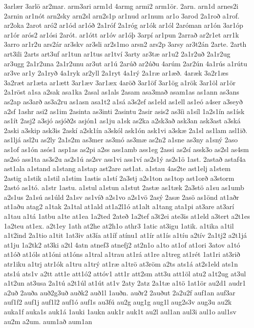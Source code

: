 {3arlær
3arlö
ar2mar.
arm3ari
arm1d
4armg
armi2
arm1ör.
2arn.
arn1d
arnes2i
2arnin
ar1nót
arn2sky
arn2sl
arn2s1p
ar1nud
ar1num
ar1o
3arod
2a1roð
a1rof.
ar2oka
2arot
aró2
ar1ód
ar1óð
2a1róf
2a1róg
ar1ók
ar1ól
2aróman
ar1ón
3ar1óp
ar1ór
arós2
ar1ósi
2arót.
ar1ótt
ar1óv
ar1óþ
3arpí
ar1pun
2arrað
ar2r1et
arr1k
3arro
ar1r2u
ars2ár
ar3skv
ar3sli
ar2s1mo
arsn2
ars2p
3arsy
ar3t2án
2arte.
2arth
art3ili
2arts
art3uf
ar1tun
ar1tus
ar1tví
3arty
ar3tæ
ar1u2
2a1r2uð
2a1r2ug
ar3ugg
2a1r2una
2a1r2unu
ar3ut
ar1ú
2arúð
ar2úðu
4arúm
2ar2ún
4a1rús
a1rútu
ar3ve
ar1y
2a1ryð
4a1ryk
ar2yll
2a1ryt
4a1rý
2a1ræ
ar1æð.
4aræk
3a2r1æs
3a2ræt
ar1æta
ar1ætt
3ar1æv
3ar1æx
4aröð
3ar1öf
3ar1ög
a1rök
3ar1öl
ar1ör
2a1röst
a1sa
a2sak
asa1ka
2asal
as1als
2asam
asa3mað
asam1as
as1ann
as3ans
as2ap
as3arð
as3a2ru
as1asn
asa1t2
a1sá
a3s2ef
as1eld
as1ell
as1eó
a4ser
a3seyð
a2sf
1ashr
asi2
as1im
2asinta
as3inti
2asintu
2asir
asis2
as3íi
a1síl
1a2s1ín
as1ísk
as1ít
2asj2
a3sjó
asjóð2s
asjón1
as1ju
a1sk
as2ka
a2sk3að
ask3an
ask3ast
a3ská
2aski
a3skip
ask3is
2askí
a2sk1ín
a3skól
ask1ón
ask1vi
a3skæ
2a1sl
as1lam
asl1ið.
as1ljá
asl2u
as2ly
2a1s2m
as3mer
as3mó
as3mæ
as2n2
a1sne
as3ny
a1sný
2aso
as1of
as1ón
asós1
asp1as
as2pi
a2ss
ass1amb
ass1eg
2assi
as2sí
assk3o
as2sl
as4sm
as2só
ass1ta
as3s2u
as2s1ú
as2sv
ass1vi
ass1ví
as2s1ý
as2s1ö
1ast.
2astað
astaf4a
ast1ala
a1stand
a1stang
a1stap
ast2are
ast1at.
a1stau
4as2te
ast1elj
a1stem
2astig
a1stik
a1stil
a1stim
1astis
a1stí
2a3stj
a2s1ton
as1top
ast1orð
a3storm
2astó
as1tó.
a1str
1astu.
a1stul
a1stun
a1stut
2astæ
as1tæk
2a3stö
a1su
as1umb
a2s1us
2a1sú
as1úld
2a1sv
as1víð
a2s1vo
a2s1vö
2asý
2asæ
2asö
as1önd
at1aðr
at1aðu
atag2
a1tak
2a1tal
at1ald
at1a2l1ó
at1alt
a1tang
ata1pi
at3are
at3arí
a1tau
a1tá
1atbu
a1te
at1ea
1a2ted
2ateð
1a2tef
a3t2ei
ate3is
at1eld
a3tert
a2t1es
1a2teu
at1ex.
a2t1ey
1ath
at2he
at2h1o
athr3
1atic
at3igu
1atik.
a1tika
a1til
a1t2ind
2a1tio
a1tit
1at3iv
at3ía
at1íf
atínu1
at1ír
at1ís
a1tíu
a2tív
2a1tj2
a2t1já
at1ju
1a2tk2
at3ki
a2tl
4atn
atnef3
atnefj2
at2n1o
a1to
at1of
at1ori
3atov
a1tó
at1óð
at1óls
at1óni
at1óns
a1tral
a1trau
at1rá
at1re
a1treg
at1rét
1at1ri
at3rið
atr1iku
a1trj
atr1ók
a1tru
a1trý
at1ræ
a1trö
at3röm
a2ts
ats1á
at2s1eld
ats1n
ats1ú
ats1v
a2tt
att1e
att1ó2
attóv1
att1r
att2sm
att3u
att1öl
atu2
a1t2ug
at3ul
a1t2un
at3usa
2a1tú
a2t1úl
at1út
at1v
2aty
2atz
2a1tæ
a1tö
1at1ör
au2d1
audr1
a2uð
2auða
auð2g3uð
auðk2
auð1l
1auðn.
auðr2
2auðut
2a2u2f
auf1an
auf3ar
auf1f2
auf1j
auf1l2
auf1ó
auf1s
au3fú
au2g
aug1g
aug1l
aug2s3v
aug3u
au2k
auka1f
auka1s
auk1á
1auki
1aukn
auk1r
auk1t
au2l
aul1an
aul3i
aul1o
aul1sv
au2m
a2um.
aum1að
aum1an
}
